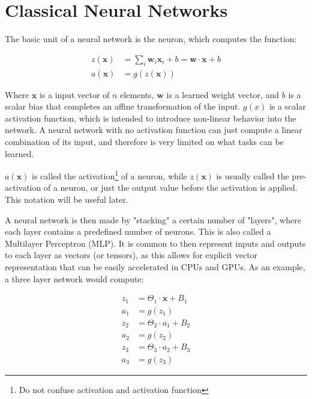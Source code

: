 \section{Classical Neural Networks}

The basic unit of a neural network is the neuron, which computes the function:

\begin{equation}
	\begin{split}
		z(\textbf{x}) &= \sum_i \textbf{w}_i \textbf{x}_i + b = \textbf{w} \cdot \textbf{x} + b  \\
		a(\textbf{x}) &= g(z(\textbf{x}))
		\label{background:neuron}	
	\end{split}
\end{equation}

Where $\textbf{x}$ is a input vector of $n$ elements, $\textbf{w}$ is a learned weight vector, and $b$ is a scalar bias that completes an affine transformation of the input. $g(x)$ is a scalar activation function, which is intended to introduce non-linear behavior into the network. A neural network with no activation function can just compute a linear combination of its input, and therefore is very limited on what tasks can be learned.

$a(\textbf{x})$ is called the activation\footnote{Do not confuse activation and activation function} of a neuron, while $z(\textbf{x})$ is usually called the pre-activation of a neuron, or just the output value before the activation is applied. This notation will be useful later.

 A neural network is then made by "stacking" a certain number of "layers", where each layer contains a predefined number of neurons. This is also called a Multilayer Perceptron (MLP). 
It is common to then represent inputs and outputs to each layer as vectors (or tensors), as this allows for explicit vector representation that can be easily accelerated in CPUs and GPUs. As an example, a three layer network would compute:

\begin{align*}
	z_1 &= \Theta_1 \cdot \textbf{x} + B_1\\
	a_1 &= g(z_1)\\
	z_2 &= \Theta_2 \cdot a_1 + B_2\\
	a_2 &= g(z_2)\\
	z_3 &= \Theta_3 \cdot a_2 + B_3\\
	a_3 &= g(z_3)
\end{align*}


